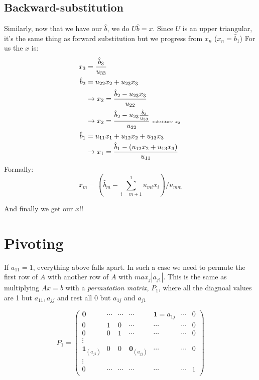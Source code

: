\subsection{Backward-substitution}
\label{sec:backward}

Similarly, now that we have our $\hat b$, we do $U\hat b = x$.
Since $U$ is an upper triangular, it's the same thing as forward
substitution but we progress from $x_n$ ($x_n=\hat b_1$)
For us the $x$ is:
\begin{align*}
x_3 &= \frac{\hat b_3}{u_{33}}\\
\hat b_2 &=u_{22}x_2 + u_{23}x_3\\
&\rightarrow x_2 = \frac{\hat b_2 - u_{23}x_3}{u_{22}}\\
&\rightarrow x_2= \frac{\hat b_2 - u_{23}\frac{\hat b_3}{u_{33}}}{u_{22}}
\text{ \tiny substitute $x_3$ }\\
\hat b_1 &= u_{11}x_1 + u_{12}x_2 + u_{13}x_3\\
&\rightarrow x_1 =  \frac{\hat b_1 -(u_{12}x_2 + u_{13}x_3)}{u_{11}}\\
\end{align*}
Formally:
$$x_m= (\hat b_m - \sum_{i=m+1}^{1}u_{mi}x_{i})/u_{mm}$$

\noi
And finally we get our $x$!!

\section{Pivoting}
If $a_{11} = 1$, everything above falls apart. In such a case we need to
permute the first row of $A$ with another row of $A$ with
$max_j|a_{j1}|$.
This is the same as multiplying $Ax=b$ with a \emph{permutation
  matrix}, $P_1$, where all the diagnoal values are 1 but $a_{11},
a_{jj}$ and rest all 0 but $a_{1j}$ and $a_{j1}$

$$P_1 = 
\begin{pmatrix}
  \mathbf{0} &  \cdots &  \cdots & \cdots &\mathbf{1}=a_{1j} & \cdots & 0\\
0 & 1 & 0& \cdots & \cdots & \cdots &  0\\
0 & 0 & 1 &\cdots & \cdots & \cdots &  0\\
\vdots\\
\mathbf{1}_{(a_{j1})} & 0 & 0 & \mathbf{0}_{(a_{jj})} & \cdots & \cdots &  0\\
\vdots\\
0 &  \cdots  & \cdots &\cdots &\cdots &   \cdots &    1\\
\end{pmatrix}
$$

